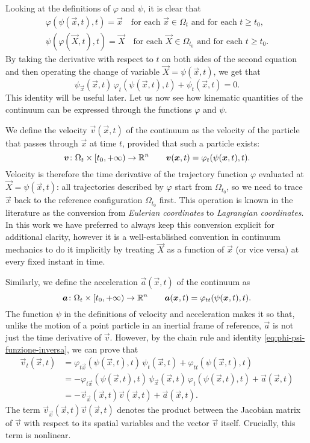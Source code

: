 Looking at the definitions of $\varphi$ and $\psi$, it is clear that
\begin{gather*}
\varphi(\psi(\vec{x},t),t) = \vec{x}
\quad \text{for each $\vec{x} \in \Omega_t$ and for each $t \geq t_0$,} \\
\psi(\varphi(\vec{X},t),t) = \vec{X}
\quad \text{for each $\vec{X} \in \Omega_{t_0}$ and for each $t \geq t_0$.}
\end{gather*}
By taking the derivative with respect to $t$ on both sides
of the second equation and then operating the change of variable
$\vec{X} = \psi(\vec{x},t)$, we get that
\begin{equation} \label{eq:phi-psi-funzione-inversa}
\psi_{\vec{x}}(\vec{x},t) \, \varphi_t(\psi(\vec{x},t),t) + \psi_t(\vec{x},t) = 0.
\end{equation}
This identity will be useful later. Let us now see how kinematic quantities
of the continuum can be expressed through the functions $\varphi$ and $\psi$.

We define the velocity $\vec{v}(\vec{x},t)$ of the continuum as the
velocity of the particle that passes through $\vec{x}$ at time $t$,
provided that such a particle exists:
\[
\bm{v} \colon \Omega_t \times [t_0,+\infty) \to \mathbb{R}^n
\qquad \bm{v}(\bm{x},t) = \varphi_t(\psi(\bm{x},t),t).
\]
Velocity is therefore the time derivative of the trajectory function $\varphi$
evaluated at $\vec{X} = \psi(\vec{x},t)$: all trajectories described by $\varphi$
start from $\Omega_{t_0}$, so we need to trace $\vec{x}$ back to the reference
configuration $\Omega_{t_0}$ first. This operation is known in the literature as
the conversion from \emph{Eulerian coordinates} to \emph{Lagrangian coordinates}.
In this work we have preferred to always keep this conversion explicit
for additional clarity, however it is a well-established convention in continuum
mechanics to do it implicitly by treating $\vec{X}$ as a function of $\vec{x}$
(or vice versa) at every fixed instant in time.

Similarly, we define the acceleration $\vec{a}(\vec{x},t)$ of the continuum as
\[
\bm{a} \colon \Omega_t \times [t_0,+\infty) \to \mathbb{R}^n
\qquad \bm{a}(\bm{x},t) = \varphi_{tt}(\psi(\bm{x},t),t).
\]
The function $\psi$ in the definitions of velocity and acceleration
makes it so that, unlike the motion of a point particle in an inertial
frame of reference, $\vec{a}$ is not just the time derivative of $\vec{v}$.
However, by the chain rule and identity \eqref{eq:phi-psi-funzione-inversa},
we can prove that
\begin{align} \label{eq:derivata-euleriana-u}
\vec{v}_t(\vec{x},t)
&= \varphi_{t\vec{x}}(\psi(\vec{x},t),t) \, \psi_t(\vec{x},t)
 + \varphi_{tt}(\psi(\vec{x},t),t) \nonumber \\
&= - \varphi_{t\vec{x}}(\psi(\vec{x},t),t) \, \psi_{\vec{x}}(\vec{x},t)
\, \varphi_t(\psi(\vec{x},t),t) + \vec{a}(\vec{x},t) \nonumber \\
&= -\vec{v}_{\vec{x}}(\vec{x},t) \vec{v}(\vec{x},t) + \vec{a}(\vec{x},t).
\end{align}
The term $\vec{v}_{\vec{x}}(\vec{x},t) \vec{v}(\vec{x},t)$ denotes the
product between the Jacobian matrix of $\vec{v}$ with respect to
its spatial variables and the vector $\vec{v}$ itself.
Crucially, this term is nonlinear.

